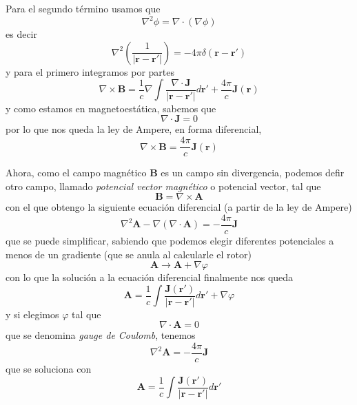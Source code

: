 \documentclass[a4paper]{article}
\numberwithin{equation}{section} %
\renewcommand{\vec}[1]{\boldsymbol{#1}}
\newcommand{\rinv}{\frac{1}{|\vec{r} - \vec{r}'|}}
\begin{document}
Para el segundo término usamos que
\begin{equation}
    \nabla^2 \phi = \nabla \cdot (\nabla \phi)
\end{equation}
es decir
\begin{equation}
    \nabla^2 \left(\rinv\right) = - 4\pi \delta(\vec{r} - \vec{r}')
\end{equation}
y para el primero integramos por partes
\[ \nabla \times \vec{B} = \frac{1}{c} \nabla \int \frac{\nabla \cdot \vec{J}}{|\vec{r} - \vec{r}'|} d\vec{r}' + \frac{4\pi}{c} \vec{J}(\vec{r})\]
y como estamos en magnetoestática, sabemos que
\begin{equation}
\nabla \cdot \vec{J} = 0
\end{equation}
por lo que nos queda la ley de Ampere, en forma diferencial,
\begin{equation}
\nabla \times \vec{B} = \frac{4\pi}{c} \vec{J}(\vec{r})
\label{eq:ampere}
\end{equation}

Ahora, como el campo magnético $\vec{B}$ es un campo sin divergencia, podemos defir otro campo, llamado \emph{potencial vector magnético} o potencial vector, tal que
\begin{equation}
\vec{B} = \nabla \times \vec{A}
\end{equation}
con el que obtengo la siguiente ecuación diferencial (a partir de la ley de Ampere)
\begin{equation}
\nabla^2 \vec{A} - \nabla (\nabla \cdot \vec{A}) = - \frac{4\pi}{c} \vec{J}
\end{equation}
que se puede simplificar, sabiendo que podemos elegir diferentes potenciales a menos de un gradiente (que se anula al calcularle el rotor)
\begin{equation}
\vec{A} \to \vec{A} + \nabla \varphi
\label{eq:gauge_A}
\end{equation}
con lo que la solución a la ecuación diferencial finalmente nos queda
\begin{equation}
\vec{A} = \frac{1}{c} \int  \frac{\vec{J}(\vec{r}')}{|\vec{r} - \vec{r}'|} d\vec{r}' + \nabla \varphi
\end{equation}
y si elegimos $\varphi$ tal que
\begin{equation}
\nabla \cdot \vec{A} = 0
\label{eq:gauge_coulumb}
\end{equation}
que se denomina \emph{gauge de Coulomb}, tenemos
\begin{equation}
\nabla^2 \vec{A} = - \frac{4\pi}{c} \vec{J}
\end{equation}
que se soluciona con
\begin{equation}
\vec{A} = \frac{1}{c} \int  \frac{\vec{J}(\vec{r}')}{|\vec{r} - \vec{r}'|} d\vec{r}'
\end{equation}
\end{document}
